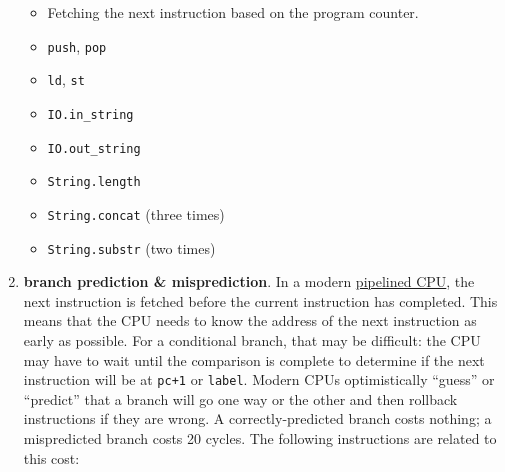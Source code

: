 \documentclass[]{article}
\begin{document}
\begin{enumerate}
  \begin{itemize}
  \itemsep1pt\parskip0pt
  \item
    Fetching the next instruction based on the program counter.
  \item
    \texttt{push}, \texttt{pop}
  \item
    \texttt{ld}, \texttt{st}
  \item
    \texttt{IO.in\_string}
  \item
    \texttt{IO.out\_string}
  \item
    \texttt{String.length}
  \item
    \texttt{String.concat} (three times)
  \item
    \texttt{String.substr} (two times)
  \end{itemize}
\item
  \textbf{branch prediction \& misprediction}. In a modern
  \href{http://en.wikipedia.org/wiki/CPU_pipeline}{pipelined CPU}, the
  next instruction is fetched before the current instruction has
  completed. This means that the CPU needs to know the address of the
  next instruction as early as possible. For a conditional branch, that
  may be difficult: the CPU may have to wait until the comparison is
  complete to determine if the next instruction will be at \texttt{pc+1}
  or \texttt{label}. Modern CPUs optimistically ``guess'' or ``predict''
  that a branch will go one way or the other and then rollback
  instructions if they are wrong. A correctly-predicted branch costs
  nothing; a mispredicted branch costs 20 cycles. The following
  instructions are related to this cost:


\end{enumerate}
\end{document}
